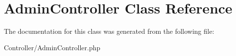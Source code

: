 \hypertarget{class_admin_controller}{\section{Admin\-Controller Class Reference}
\label{class_admin_controller}
}


The documentation for this class was generated from the following file\-:\begin{DoxyCompactItemize}
\item 
Controller/Admin\-Controller.\-php\end{DoxyCompactItemize}
